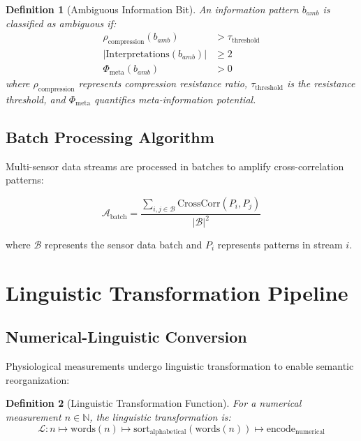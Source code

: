 \documentclass[12pt,a4paper]{article}
\newtheorem{definition}{Definition}
\begin{document}
\begin{definition}[Ambiguous Information Bit]
An information pattern $b_{amb}$ is classified as ambiguous if:
\begin{align}
\rho_{\text{compression}}(b_{amb}) &> \tau_{\text{threshold}} \\
|\text{Interpretations}(b_{amb})| &\geq 2 \\
\Phi_{\text{meta}}(b_{amb}) &> 0
\end{align}
where $\rho_{\text{compression}}$ represents compression resistance ratio, $\tau_{\text{threshold}}$ is the resistance threshold, and $\Phi_{\text{meta}}$ quantifies meta-information potential.
\end{definition}

\subsection{Batch Processing Algorithm}

Multi-sensor data streams are processed in batches to amplify cross-correlation patterns:

\begin{equation}
\mathcal{A}_{\text{batch}} = \frac{\sum_{i,j \in \mathcal{B}} \text{CrossCorr}(P_i, P_j)}{|\mathcal{B}|^2}
\end{equation}

where $\mathcal{B}$ represents the sensor data batch and $P_i$ represents patterns in stream $i$.

\section{Linguistic Transformation Pipeline}

\subsection{Numerical-Linguistic Conversion}

Physiological measurements undergo linguistic transformation to enable semantic reorganization:

\begin{definition}[Linguistic Transformation Function]
For a numerical measurement $n \in \mathbb{N}$, the linguistic transformation is:
\begin{equation}
\mathcal{L}: n \mapsto \text{words}(n) \mapsto \text{sort}_{\text{alphabetical}}(\text{words}(n)) \mapsto \text{encode}_{\text{numerical}}
\end{equation}
\end{definition}
\end{document}
